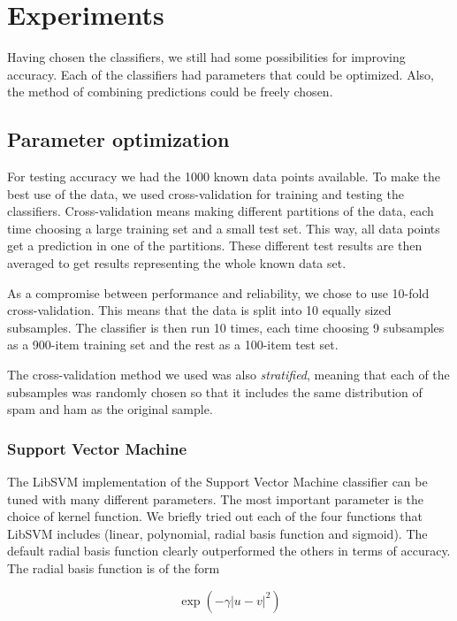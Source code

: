 \section{Experiments} \label{sec:experiments}

Having chosen the classifiers, we still had some possibilities for
improving accuracy. Each of the classifiers had parameters that could be
optimized. Also, the method of combining predictions could be freely
chosen.

\subsection{Parameter optimization}

For testing accuracy we had the 1000 known data points available. To
make the best use of the data, we used cross-validation for training and
testing the classifiers. Cross-validation means making different
partitions of the data, each time choosing a large training set and a
small test set. This way, all data points get a prediction in one of the
partitions. These different test results are then averaged to get
results representing the whole known data set.

As a compromise between performance and reliability, we chose to use
10-fold cross-validation. This means that the data is split into 10
equally sized subsamples. The classifier is then run 10 times, each time
choosing 9 subsamples as a 900-item training set and the rest as a
100-item test set.

The cross-validation method we used was also \emph{stratified}, meaning
that each of the subsamples was randomly chosen so that it includes the
same distribution of spam and ham as the original sample.

\subsubsection{Support Vector Machine}

The LibSVM implementation of the Support Vector Machine classifier can
be tuned with many different parameters. The most important parameter is
the choice of kernel function. We briefly tried out each of the four
functions that LibSVM includes (linear, polynomial, radial basis
function and sigmoid). The default radial basis function clearly
outperformed the others in terms of accuracy. The radial basis function
is of the form

\begin{equation}
\exp(-\gamma |u-v|^2)
\end{equation}

